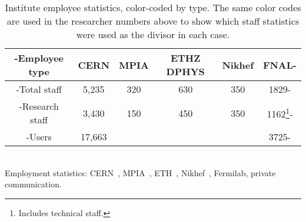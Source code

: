 \documentclass[../SustainableHEP.tex]{subfiles}
\begin{document}
\begin{table*}[h]
{\footnotesize
{}
\centering
\begin{tabular}{>{\kern-\tabcolsep}cccccc<{\kern-\tabcolsep}}
\toprule
Employee type& CERN & MPIA & ETHZ DPHYS & Nikhef & FNAL\\
\midrule
Total staff & 5,235 & 320 & 630 & 350 & 1829\\
\cellcolor{Pythongreen!20}Research staff &\cellcolor{Pythongreen!20} 3,430 &\cellcolor{Pythongreen!20} 150 &\cellcolor{Pythongreen!20} 450 &\cellcolor{Pythongreen!20}  350 &\cellcolor{Pythongreen!20} 1162\footnote{Includes technical staff.}\\
\cellcolor{Pythonblue!30}Users & \cellcolor{Pythonblue!30}17,663& \cellcolor{Pythonblue!30}&\cellcolor{Pythonblue!30} & \cellcolor{Pythonblue!30}& \cellcolor{Pythonblue!30}3725\\
\bottomrule
\end{tabular}}\\
\scriptsize{Employment statistics: CERN~\cite{CERN-HR-STAFF-STAT-2019}, MPIA~\cite{Jahnke2020}, ETH~\cite{Beisert2020}, Nikhef~\cite{Nikhef}, Fermilab, private communication.}
\caption[Employee statistics for \ACR\ institutions]{Institute employee statistics, color-coded by type.  The same color codes are used in the researcher numbers above to show which staff statistics were used as the divisor in each case.\label{tab:ComparativeEmissionsDenominator}}
\end{table*}
\end{document}
